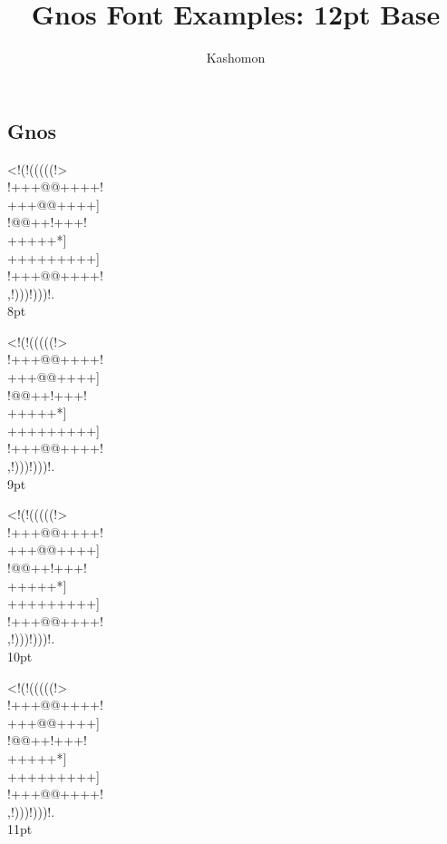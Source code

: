 \documentclass[12pt]{article}
\begin{document}
\title{Gnos Font Examples: 12pt Base}
\author{Kashomon}
\maketitle

\begin{center}
\section*{Gnos}
{
\gnoseight%
<!(!(((((!>\\
!+++@@++++!\\
+++@@++++]\\
!@@++!+++!\\
+++++*]\\
+++++++++]\\
!+++@@++++!\\
,!)))!)))!.\\
}
8pt

{
\gnosnine%
<!(!(((((!>\\
!+++@@++++!\\
+++@@++++]\\
!@@++!+++!\\
+++++*]\\
+++++++++]\\
!+++@@++++!\\
,!)))!)))!.\\
}
9pt


{
\gnosten%
<!(!(((((!>\\
!+++@@++++!\\
+++@@++++]\\
!@@++!+++!\\
+++++*]\\
+++++++++]\\
!+++@@++++!\\
,!)))!)))!.\\
}
10pt

\newpage

{
\gnoseleven%
<!(!(((((!>\\
!+++@@++++!\\
+++@@++++]\\
!@@++!+++!\\
+++++*]\\
+++++++++]\\
!+++@@++++!\\
,!)))!)))!.\\
}
11pt


\end{center}
\end{document}
